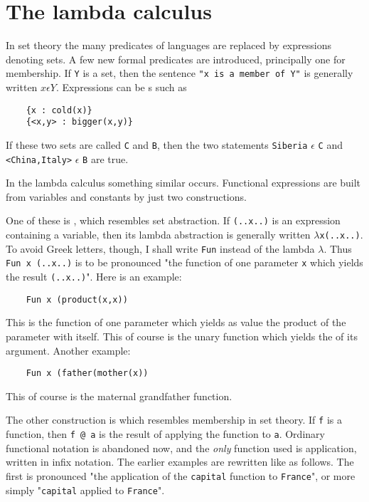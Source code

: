 \section{The lambda calculus}
\par
In set theory the many predicates of languages are replaced by
expressions denoting sets.
A few new formal predicates are introduced,
principally one for membership.
If \verb#Y# is a set,
then the sentence \verb#"x is a member of Y"#
is generally written $x \epsilon Y$.
Expressions can be s such as
\begin{verbatim}
    {x : cold(x)}
    {<x,y> : bigger(x,y)}
\end{verbatim}
If these two sets are called \verb#C# and \verb#B#,
then the two statements \verb#Siberia# $\epsilon$ \verb#C#
and \verb#<China,Italy># $\epsilon$ \verb#B# are true.
\par
In the lambda calculus something similar occurs.
Functional expressions are built from variables and constants
by just two constructions.
\par
One of these is ,
which resembles set abstraction.
If \verb#(..x..)# is an expression containing a variable,
then its lambda abstraction is generally written $\lambda$\verb#x(..x..)#.
To avoid Greek letters, though,
I shall write \verb#Fun# instead of the lambda $\lambda$.
Thus \verb#Fun x (..x..)# is to be pronounced
"the function of one parameter \verb#x# which yields the result
\verb#(..x..)#".
Here is an example:
\begin{verbatim}
    Fun x (product(x,x))
\end{verbatim}
This is the function of one parameter which yields
as value the product of the parameter with itself.
This of course is the unary function which yields
the  of its argument.
Another example:
\begin{verbatim}
    Fun x (father(mother(x))
\end{verbatim}
This of course is the maternal grandfather function.
\par
The other construction is 
which resembles membership in set theory.
If \verb#f# is a function, then \verb#f @ a#
is the result of applying the function to \verb#a#.
Ordinary functional notation is abandoned now,
and the {\em only} function used is
application, written in infix notation.
The earlier examples are rewritten like as follows.
The first is pronounced
"the application of the \verb#capital# function to \verb#France#",
or more simply
"\verb#capital# applied to \verb#France#".
